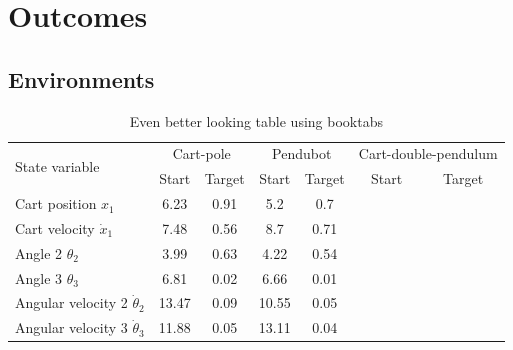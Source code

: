 \chapter{Outcomes}

\ifpdf
    \graphicspath{{Chapter3/Figs/Raster/}{Chapter3/Figs/PDF/}{Chapter3/Figs/}}
\else
    \graphicspath{{Chapter3/Figs/Vector/}{Chapter3/Figures/}}
\fi

\section{Environments}
\label{S:PILCO-environments}
\begin{table}
\caption{Even better looking table using booktabs}
\centering
\label{table:good_table}
\begin{tabular}{l c c c c c c}
\toprule
\multirow{2}{*}{State variable} & \multicolumn{2}{c}{Cart-pole} & \multicolumn{2}{c}{Pendubot}  &
\multicolumn{2}{c}{Cart-double-pendulum}  \\ 
\cmidrule{2-7}
  & Start & Target & Start & Target & Start & Target \\ 
\midrule
Cart position $x_1$ & 6.23 & 0.91 & 5.2  & 0.7 & & \\

Cart velocity $\dot x_1$ & 7.48 & 0.56 & 8.7  & 0.71& & \\

Angle 2 $\theta_2$ & 3.99 & 0.63 & 4.22 & 0.54& & \\

Angle 3 $\theta_3$ & 6.81 & 0.02 & 6.66 & 0.01 & &\\

Angular velocity 2 $\dot \theta_2$ & 13.47 & 0.09 & 10.55 & 0.05 & &\\

Angular velocity 3 $\dot \theta_3$ & 11.88 & 0.05 & 13.11 & 0.04& &\\ 
\bottomrule
\end{tabular}
\end{table}

